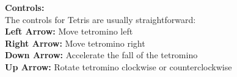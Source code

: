 \textbf{Controls:}\vspace{5mm}\\
The controls for Tetris are usually straightforward:\\
\textbf{Left Arrow: }Move tetromino left\\
\textbf{Right Arrow: }Move tetromino right\\
\textbf{Down Arrow: }Accelerate the fall of the tetromino\\
\textbf{Up Arrow: }Rotate tetromino clockwise or counterclockwise\\

